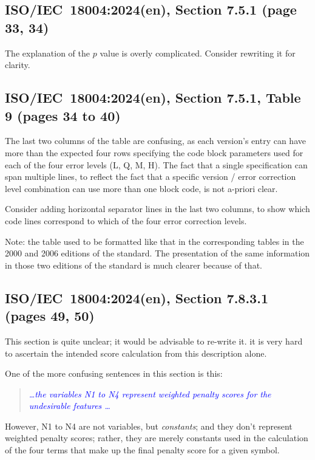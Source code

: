 \documentclass[a4paper,twoside]{article}
\newcommand{\shortstandard}{ISO/IEC~18004}
\newcommand{\standard}{\shortstandard:2024(en)}
\newcommand{\quotestandard}[1]{\textcolor{blue}{\textit{#1}}}
\newcommand{\ddd}{\dots}
\begin{document}
\subsection{\standard, Section 7.5.1 (page 33, 34)}

The explanation of the $p$ value is overly complicated. Consider rewriting it for clarity.

\subsection{\standard, Section 7.5.1, Table 9 (pages 34 to 40)}

The last two columns of the table are confusing, as each version's entry can have more than the expected
four rows specifying the code block parameters used for each of the four error levels (L, Q, M, H). The
fact that a single specification can span multiple lines, to reflect the fact that a specific
version / error correction level combination can use more than one block code, is not a-priori clear.

Consider adding horizontal separator lines in the last two columns, to show
which code lines correspond to which of the four error correction levels.

Note: the table used to be formatted like that in the corresponding tables in the 2000
and 2006 editions of the standard. The presentation of the same information in those two
editions of the standard is much clearer because of that.

\subsection{\standard, Section 7.8.3.1 (pages 49, 50)}
\label{sec:dmp-scoring}

This section is quite unclear; it would be advisable to re-write it. it is very
hard to ascertain the intended score calculation from this description alone. 

One of the more confusing sentences in this section is this:

\begin{quote}
\quotestandard{\ddd the variables N1 to N4 represent weighted penalty scores for the undesirable features \ddd}
\end{quote}

However, N1 to N4 are not variables, but \emph{constants}; and they don't represent weighted penalty
scores; rather, they are merely constants used in the calculation of the four terms that make up
the final penalty score for a given symbol.
\end{document}
